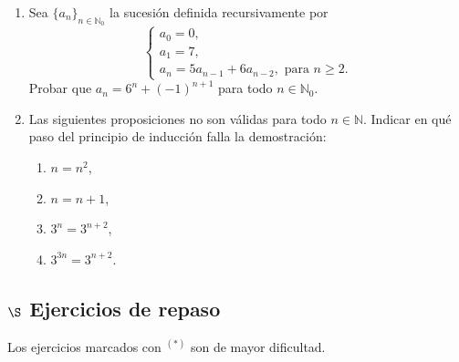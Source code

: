 \documentclass[a4paper,12pt,twoside,spanish,reqno]{amsbook}
\numberwithin{equation}{section}
\begin{document}
\begin{enumerate}
\item Sea $\{a_n\}_{n\in\mathbb N_0}$ la sucesi\'on definida recursivamente por
$$\begin{cases}
   a_0=0, \\a_1=7, \\a_{n} = 5a_{n-1}+6a_{n-2}, \text{ para $n\geq 2$}.
  \end{cases}$$
Probar que $a_n=6^n + (-1)^{n+1}$ para todo $n\in \mathbb N_0$.

\item Las siguientes proposiciones no son válidas para todo $n \in {\mathbb N}$. Indicar en qué paso del principio de inducción falla la demostración:
\begin{multicols}{4}
\begin{enumerate}
\item  $n=n^2$,
\item  $n=n+1$,
\item  $3^n = 3^{n+2}$,
\item  $3^{3n} = 3^{n+2}$.
\end{enumerate}
\end{multicols}
\end{enumerate}
\subsection*{$\S$ Ejercicios de repaso} Los ejercicios marcados con ${}^{(*)}$ son de mayor dificultad.
\end{document}
